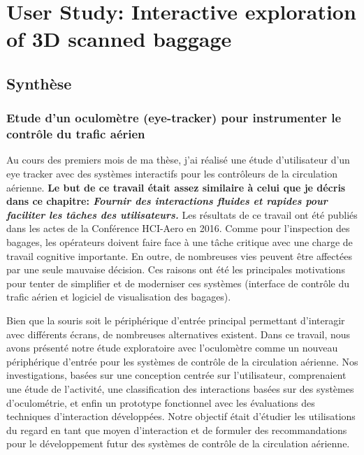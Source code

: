 \chapter{User Study: Interactive exploration of 3D scanned baggage} %
\label{DesignStudy}

\section{Synthèse}

\subsection{Etude d'un oculomètre (eye-tracker) pour instrumenter le contrôle du trafic aérien}
Au cours des premiers mois de ma thèse, j'ai réalisé une étude d'utilisateur d'un eye tracker avec des systèmes interactifs pour les contrôleurs de la circulation aérienne. \textbf{Le but de ce travail était assez similaire à celui que je décris dans ce chapitre: \textit{Fournir des interactions fluides et rapides pour faciliter les tâches des utilisateurs.}} Les résultats de ce travail ont été publiés dans les actes de la Conférence HCI-Aero en 2016. Comme pour l'inspection des bagages, les opérateurs doivent faire face à une tâche critique avec une charge de travail cognitive importante. En outre, de nombreuses vies peuvent être affectées par une seule mauvaise décision. Ces raisons ont été les principales motivations pour tenter de simplifier et de moderniser ces systèmes (interface de contrôle du trafic aérien et logiciel de visualisation des bagages).

Bien que la souris soit le périphérique d’entrée principal permettant d’interagir avec différents écrans, de nombreuses alternatives existent. Dans ce travail, nous avons présenté notre étude exploratoire avec l’oculomètre comme un nouveau périphérique d’entrée pour les systèmes de contrôle de la circulation aérienne. Nos investigations, basées sur une conception centrée sur l'utilisateur, comprenaient une étude de l'activité, une classification des interactions basées sur des systèmes d'oculométrie, et enfin un prototype fonctionnel avec les évaluations des techniques d'interaction développées. Notre objectif était d'étudier les utilisations du regard en tant que moyen d'interaction et de formuler des recommandations pour le développement futur des systèmes de contrôle de la circulation aérienne.

